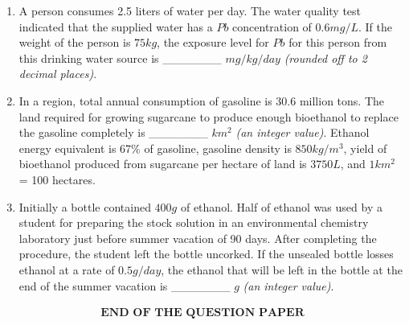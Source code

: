 \documentclass[journal]{IEEEtran}
\begin{document}
\begin{enumerate}
\item A person consumes 2.5 liters of water per day. The water quality test indicated that the supplied water has a $Pb$ concentration of $0.6 mg/L$. If the weight of the person is $75 kg$, the exposure level for $Pb$ for this person from this drinking water source is \_\_\_\_\_\_\_ $mg/kg/day$ \textit{(rounded off to 2 decimal places)}.
\hfill{}

\item In a region, total annual consumption of gasoline is 30.6 million tons. The land required for growing sugarcane to produce enough bioethanol to replace the gasoline completely is \_\_\_\_\_\_\_ $km^2$ \textit{(an integer value)}.
Ethanol energy equivalent is 67\% of gasoline, gasoline density is $850 kg/m^3$, yield of bioethanol produced from sugarcane per hectare of land is $3750 L$, and $1 km^2$ = 100 hectares.
\hfill{}

\item Initially a bottle contained $400 g$ of ethanol. Half of ethanol was used by a student for preparing the stock solution in an environmental chemistry laboratory just before summer vacation of 90 days. After completing the procedure, the student left the bottle uncorked. If the unsealed bottle losses ethanol at a rate of $0.5 g/day$, the ethanol that will be left in the bottle at the end of the summer vacation is \_\_\_\_\_\_\_ $g$ \textit{(an integer value)}.
\hfill{}
\end{enumerate}
\bigskip

\begin{align*}
\textbf{END OF THE QUESTION PAPER}
\end{align*}
\end{document}
